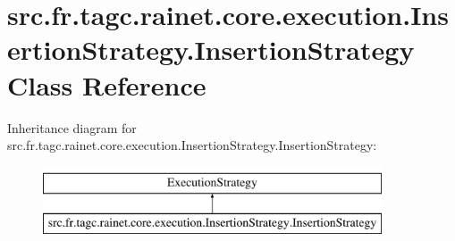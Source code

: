 \hypertarget{classsrc_1_1fr_1_1tagc_1_1rainet_1_1core_1_1execution_1_1InsertionStrategy_1_1InsertionStrategy}{\section{src.\-fr.\-tagc.\-rainet.\-core.\-execution.\-Insertion\-Strategy.\-Insertion\-Strategy Class Reference}
\label{classsrc_1_1fr_1_1tagc_1_1rainet_1_1core_1_1execution_1_1InsertionStrategy_1_1InsertionStrategy}
}
Inheritance diagram for src.\-fr.\-tagc.\-rainet.\-core.\-execution.\-Insertion\-Strategy.\-Insertion\-Strategy\-:\begin{figure}[H]
\begin{center}
\leavevmode
\includegraphics[height=2.000000cm]{classsrc_1_1fr_1_1tagc_1_1rainet_1_1core_1_1execution_1_1InsertionStrategy_1_1InsertionStrategy}
\end{center}
\end{figure}
